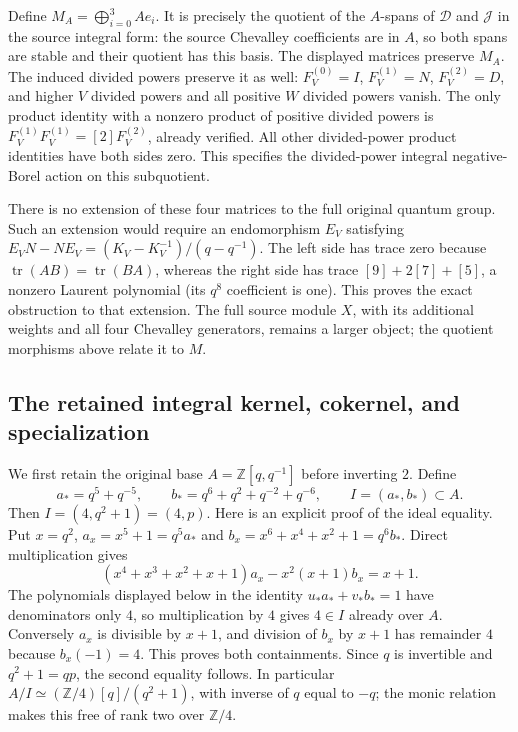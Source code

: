 Define $M_A=\bigoplus_{i=0}^3Ae_i$. It is precisely the quotient of
the $A$-spans of $\mathcal D$ and $\mathcal J$ in the source integral
form: the source Chevalley coefficients are in $A$, so both spans
are stable and their quotient has this basis. The displayed matrices
preserve $M_A$. The induced divided powers preserve it as well:
$F_V^{(0)}=I$, $F_V^{(1)}=N$, $F_V^{(2)}=D$, and higher $V$ divided
powers and all positive $W$ divided powers vanish. The only product
identity with a nonzero product of positive divided powers is
$F_V^{(1)}F_V^{(1)}=[2]F_V^{(2)}$, already verified. All other
divided-power product identities have both sides zero. This specifies
the divided-power integral negative-Borel action on this subquotient.

There is no extension of these four matrices to the full original
quantum group. Such an extension would require an endomorphism $E_V$
satisfying $E_VN-NE_V=(K_V-K_V^{-1})/(q-q^{-1})$. The left side has
trace zero because $\operatorname{tr}(AB)=\operatorname{tr}(BA)$,
whereas the right side has trace $[9]+2[7]+[5]$, a nonzero Laurent
polynomial (its $q^8$ coefficient is one). This proves the exact
obstruction to that extension. The full source module $X$, with
its additional weights and all four Chevalley generators, remains
a larger object; the quotient morphisms above relate it to $M$.

\subsection{The retained integral kernel, cokernel, and specialization}

We first retain the original base $A=\mathbb Z[q,q^{-1}]$ before
inverting $2$. Define
\[
 a_*=q^5+q^{-5},\qquad b_*=q^6+q^2+q^{-2}+q^{-6},\qquad
 I=(a_*,b_*)\subset A.
\]
Then $I=(4,q^2+1)=(4,p)$. Here is an explicit proof of the ideal
equality. Put $x=q^2$, $a_x=x^5+1=q^5a_*$ and
$b_x=x^6+x^4+x^2+1=q^6b_*$. Direct multiplication gives
\[
 (x^4+x^3+x^2+x+1)a_x-x^2(x+1)b_x=x+1.
\]
The polynomials displayed below in the identity
$u_*a_*+v_*b_*=1$ have denominators only $4$, so multiplication by
$4$ gives $4\in I$ already over $A$. Conversely $a_x$ is divisible
by $x+1$, and division of $b_x$ by $x+1$ has remainder $4$ because
$b_x(-1)=4$. This proves both containments. Since $q$ is invertible
and $q^2+1=qp$, the second equality follows. In particular
$A/I\simeq(\mathbb Z/4)[q]/(q^2+1)$, with inverse of $q$ equal to
$-q$; the monic relation makes this free of rank two over $\mathbb Z/4$.

